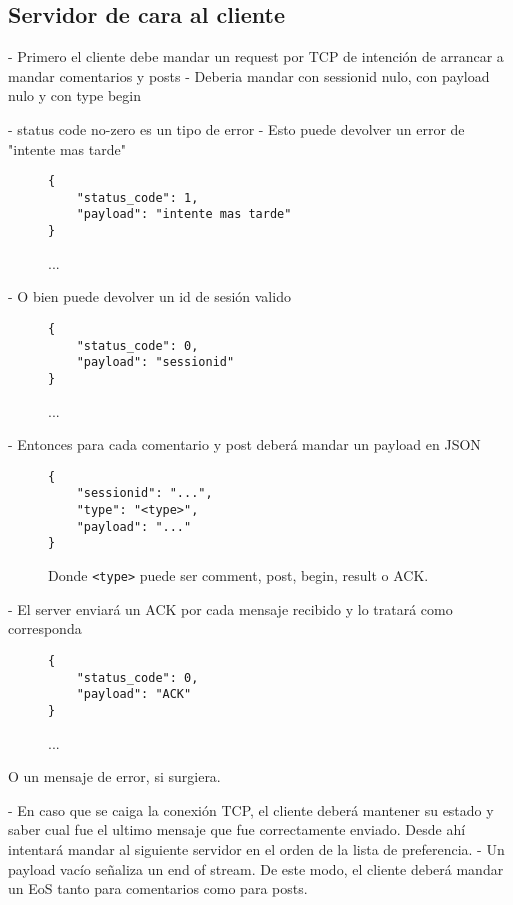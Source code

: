 \documentclass[titlepage,a4paper,oneside]{article}
\begin{document}
\subsection{Servidor de cara al cliente}\label{ServerClient}
- Primero el cliente debe mandar un request por TCP de intención de arrancar a mandar comentarios y posts
	- Deberia mandar con sessionid nulo, con payload nulo y con type begin

- status code no-zero es un tipo de error
- Esto puede devolver un error de "intente mas tarde"

\begin{figure}[H]
\begin{verbatim}
{
	"status_code": 1,
	"payload": "intente mas tarde"
}
\end{verbatim}
\caption{...}
\end{figure}


- O bien puede devolver un id de sesión valido
\begin{figure}[H]
\begin{verbatim}
{
	"status_code": 0,
	"payload": "sessionid"
}
\end{verbatim}
\caption{...}
\end{figure}


- Entonces para cada comentario y post deberá mandar un payload en JSON

\begin{figure}[H]
\begin{verbatim}
{
	"sessionid": "...",
	"type": "<type>",
	"payload": "..."
}
\end{verbatim}
\caption{Donde \texttt{<type>} puede ser comment, post, begin, result o ACK.}
\end{figure}


- El server enviará un ACK por cada mensaje recibido y lo tratará como corresponda

\begin{figure}[H]
\begin{verbatim}
{
	"status_code": 0,
	"payload": "ACK"
}
\end{verbatim}
\caption{...}
\end{figure}


O un mensaje de error, si surgiera.

- En caso que se caiga la conexión TCP, el cliente deberá mantener su estado y saber cual fue el ultimo mensaje que fue correctamente enviado. Desde ahí intentará mandar al siguiente servidor en el orden de la lista de preferencia.
- Un payload vacío señaliza un end of stream. De este modo, el cliente deberá mandar un EoS tanto para comentarios como para posts.
\end{document}
